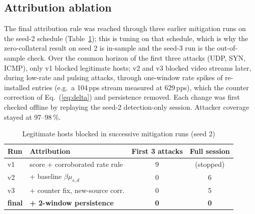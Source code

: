 \documentclass[conference]{IEEEtran}
\begin{document}
\subsection{Attribution ablation}\label{sec:ablation}
The final attribution rule was reached through three earlier mitigation runs on the seed-2 schedule (Table~\ref{tab:abl}); this is tuning on that schedule, which is why the zero-collateral result on seed 2 is in-sample and the seed-3 run is the out-of-sample check. Over the common horizon of the first three attacks (UDP, SYN, ICMP), only v1 blocked legitimate hosts; v2 and v3 blocked video streams later, during low-rate and pulsing attacks, through one-window rate spikes of re-installed entries (e.g.\ a 104\,pps stream measured at 629\,pps), which the counter correction of Eq.~(\ref{eq:delta}) and persistence removed. Each change was first checked offline by replaying the seed-2 detection-only session. Attacker coverage stayed at 97--98\,\%.

\begin{table}[t]
\caption{Legitimate hosts blocked in successive mitigation runs (seed 2)}
\label{tab:abl}
\centering
\setlength{\tabcolsep}{3pt}
\begin{tabular}{llcc}
\toprule
Run & Attribution & First 3 attacks & Full session \\
\midrule
v1 & score + corroborated rate rule & 9 & (stopped) \\
v2 & + baseline $\beta\mu_{s,d}$ & 0 & 6 \\
v3 & + counter fix, new-source corr. & 0 & 5 \\
\textbf{final} & \textbf{+ 2-window persistence} & \textbf{0} & \textbf{0} \\
\bottomrule
\end{tabular}
\end{table}
\end{document}
